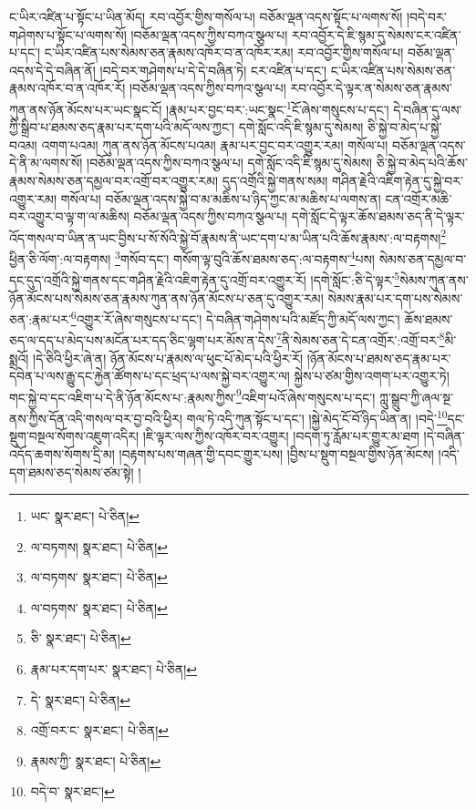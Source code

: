 ང་ཡིར་འཛིན་པ་སྟོང་པ་ཡིན་མོད། རབ་འབྱོར་གྱིས་གསོལ་པ། བཅོམ་ལྡན་འདས་སྟོང་པ་ལགས་སོ། །བདེ་བར་གཤེགས་པ་སྟོང་པ་ལགས་སོ། །བཅོམ་ལྡན་འདས་ཀྱིས་བཀའ་སྩལ་པ། རབ་འབྱོར་དེ་ཇི་སྙམ་དུ་སེམས་ངར་འཛིན་པ་དང་། ང་ཡིར་འཛིན་པས་སེམས་ཅན་རྣམས་འཁོར་བ་ན་འཁོར་རམ། རབ་འབྱོར་གྱིས་གསོལ་པ། བཅོམ་ལྡན་འདས་དེ་དེ་བཞིན་ནོ། །བདེ་བར་གཤེགས་པ་དེ་དེ་བཞིན་ཏེ། ངར་འཛིན་པ་དང་། ང་ཡིར་འཛིན་པས་སེམས་ཅན་རྣམས་འཁོར་བ་ན་འཁོར་རོ། །བཅོམ་ལྡན་འདས་ཀྱིས་བཀའ་སྩལ་པ། རབ་འབྱོར་དེ་ལྟར་ན་སེམས་ཅན་རྣམས་ཀུན་ནས་ཉོན་མོངས་པར་ཡང་སྣང་ངོ། །རྣམ་པར་བྱང་བར་:ཡང་སྣང་\footnote{ཡང་  སྣར་ཐང་།  པེ་ཅིན། }ངོ་ཞེས་གསུངས་པ་དང་། དེ་བཞིན་དུ་ལས་ཀྱི་སྒྲིབ་པ་ཐམས་ཅད་རྣམ་པར་དག་པའི་མདོ་ལས་ཀྱང་། དགེ་སློང་འདི་ཇི་སྙམ་དུ་སེམས། ཅི་སྐྱེ་བ་མེད་པ་སྐྱེ་བའམ། འགག་པའམ། ཀུན་ནས་ཉོན་མོངས་པའམ། རྣམ་པར་བྱང་བར་འགྱུར་རམ། གསོལ་པ། བཅོམ་ལྡན་འདས་དེ་ནི་མ་ལགས་སོ། །བཅོམ་ལྡན་འདས་ཀྱིས་བཀའ་སྩལ་པ། དགེ་སློང་འདི་ཇི་སྙམ་དུ་སེམས། ཅི་སྐྱེ་བ་མེད་པའི་ཆོས་རྣམས་སེམས་ཅན་དམྱལ་བར་འགྲོ་བར་འགྱུར་རམ། དུད་འགྲོའི་སྐྱེ་གནས་སམ། གཤིན་རྗེའི་འཇིག་རྟེན་དུ་སྐྱེ་བར་འགྱུར་རམ། གསོལ་པ། བཅོམ་ལྡན་འདས་སྐྱེ་བ་མ་མཆིས་པ་ཉིད་ཀྱང་མ་མཆིས་པ་ལགས་ན། ངན་འགྲོར་མཆི་བར་འགྱུར་བ་ལྟ་ག་ལ་མཆིས། བཅོམ་ལྡན་འདས་ཀྱིས་བཀའ་སྩལ་པ། དགེ་སློང་དེ་ལྟར་ཆོས་ཐམས་ཅད་ནི་དེ་ལྟར་འོད་གསལ་བ་ཡིན་ན་ཡང་བྱིས་པ་སོ་སོའི་སྐྱེ་བོ་རྣམས་ནི་ཡང་དག་པ་མ་ཡིན་པའི་ཆོས་རྣམས་:ལ་བརྟགས།\footnote{ལ་བཏགས།  སྣར་ཐང་།  པེ་ཅིན། } ཕྱིན་ཅི་ལོག་:ལ་བརྟགས། \footnote{ལ་བཏགས་  སྣར་ཐང་།  པེ་ཅིན། }གསོབ་དང་། གསོག་ལྟ་བུའི་ཆོས་ཐམས་ཅད་:ལ་བརྟགས་\footnote{ལ་བཏགས་  སྣར་ཐང་།  པེ་ཅིན། }པས། སེམས་ཅན་དམྱལ་བ་དང་དུད་འགྲོའི་སྐྱེ་གནས་དང་གཤིན་རྗེའི་འཇིག་རྟེན་དུ་འགྲོ་བར་འགྱུར་རོ། །དགེ་སློང་:ཅི་དེ་ལྟར་\footnote{ཅི་  སྣར་ཐང་།  པེ་ཅིན། }སེམས་ཀུན་ནས་ཉོན་མོངས་པས་སེམས་ཅན་རྣམས་ཀུན་ནས་ཉོན་མོངས་པ་ཅན་དུ་འགྱུར་རམ། སེམས་རྣམ་པར་དག་པས་སེམས་ཅན་:རྣམ་པར་\footnote{རྣམ་པར་དག་པར་  སྣར་ཐང་།  པེ་ཅིན། }འགྱུར་རོ་ཞེས་གསུངས་པ་དང་། དེ་བཞིན་གཤེགས་པའི་མཛོད་ཀྱི་མདོ་ལས་ཀྱང་། ཆོས་ཐམས་ཅད་ལ་དད་པ་མེད་པས་མངོན་པར་དད་ཅིང་ལྷག་པར་མོས་ན་དེས་\footnote{དེ་  སྣར་ཐང་།  པེ་ཅིན། }ནི་སེམས་ཅན་དེ་ངན་འགྲོར་:འགྲོ་བར་\footnote{འགྲོ་བར་ང་  སྣར་ཐང་།  པེ་ཅིན། }མི་སྨྲའོ། །དེ་ཅིའི་ཕྱིར་ཞེ་ན། ཉོན་མོངས་པ་རྣམས་ལ་ཕུང་པོ་མེད་པའི་ཕྱིར་རོ། །ཉོན་མོངས་པ་ཐམས་ཅད་རྣམ་པར་དབེན་པ་ལས་རྒྱུ་དང་རྐྱེན་ཚོགས་པ་དང་ཕྲད་པ་ལས་སྐྱེ་བར་འགྱུར་ལ། སྐྱེས་པ་ཙམ་གྱིས་འགག་པར་འགྱུར་ཏེ། གང་སྐྱེ་བ་དང་འཇིག་པ་དེ་ནི་ཉོན་མོངས་པ་:རྣམས་ཀྱིས་\footnote{རྣམས་ཀྱི་  སྣར་ཐང་།  པེ་ཅིན། }འཇིག་པའོ་ཞེས་གསུངས་པ་དང་། ཀླུ་སྒྲུབ་ཀྱི་ཞལ་སྔ་ནས་ཀྱིས་དོན་འདི་གསལ་བར་བྱ་བའི་ཕྱིར། གལ་ཏེ་འདི་ཀུན་སྟོང་པ་དང་། །སྐྱེ་མེད་ངོ་བོ་ཉིད་ཡིན་ན། །བདེ་\footnote{བདེ་བ་  སྣར་ཐང་། }དང་སྡུག་བསྔལ་སོགས་འཇུག་འདིར། །ཇི་ལྟར་ལས་ཀྱིས་འཁོར་བར་འགྱུར། །བདག་ཏུ་རློམ་པར་གྱུར་མ་ཐག །དེ་བཞིན་འདོད་ཆགས་སོགས་དྲི་མ། །བརྟགས་པས་གཞན་གྱི་དབང་གྱུར་པས། །བྱིས་པ་སྡུག་བསྔལ་གྱིས་ཉོན་མོངས། །འདི་དག་ཐམས་ཅད་སེམས་ཙམ་སྟེ། །
